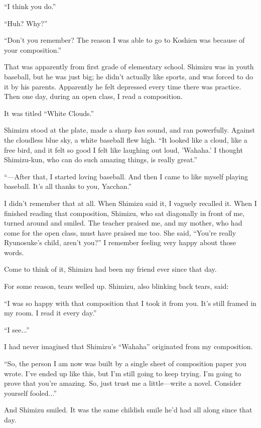 \documentclass[
    a4paper,
    12pt,
    twoside,
    openany,
    UTF8,
    fontset=windows
]{ctexbook}
\begin{document}
``I think you do.''

``Huh? Why?''

``Don't you remember? The reason I was able to go to Koshien was because of your composition.''

That was apparently from first grade of elementary school. Shimizu was in youth baseball, but he was just big; he didn't actually like sports, and was forced to do it by his parents. Apparently he felt depressed every time there was practice. Then one day, during an open class, I read a composition.

It was titled ``White Clouds.''

Shimizu stood at the plate, made a sharp \textit{kan} sound, and ran powerfully. Against the cloudless blue sky, a white baseball flew high. ``It looked like a cloud, like a free bird, and it felt so good I felt like laughing out loud, 'Wahaha.' I thought Shimizu-kun, who can do such amazing things, is really great.''

``---After that, I started loving baseball. And then I came to like myself playing baseball. It's all thanks to you, Yacchan.''

I didn't remember that at all. When Shimizu said it, I vaguely recalled it. When I finished reading that composition, Shimizu, who sat diagonally in front of me, turned around and smiled. The teacher praised me, and my mother, who had come for the open class, must have praised me too. She said, ``You're really Ryunosuke's child, aren't you?'' I remember feeling very happy about those words.

Come to think of it, Shimizu had been my friend ever since that day.

For some reason, tears welled up. Shimizu, also blinking back tears, said:

``I was so happy with that composition that I took it from you. It's still framed in my room. I read it every day.''

``I see...''

I had never imagined that Shimizu's ``Wahaha'' originated from my composition.

``So, the person I am now was built by a single sheet of composition paper you wrote. I've ended up like this, but I'm still going to keep trying. I'm going to prove that you're amazing. So, just trust me a little—write a novel. Consider yourself fooled...''

And Shimizu smiled. It was the same childish smile he'd had all along since that day.
\end{document}
